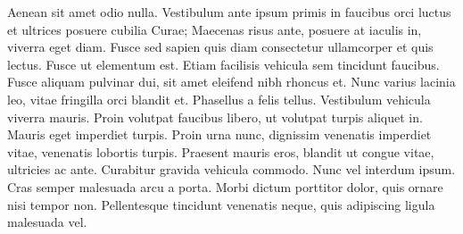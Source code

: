 Aenean sit amet odio nulla.
Vestibulum ante ipsum primis in faucibus orci luctus et ultrices posuere cubilia Curae; Maecenas risus ante, posuere at iaculis in, viverra eget diam.
Fusce sed sapien quis diam consectetur ullamcorper et quis lectus.
Fusce ut elementum est.
Etiam facilisis vehicula sem tincidunt faucibus.
Fusce aliquam pulvinar dui, sit amet eleifend nibh rhoncus et.
Nunc varius lacinia leo, vitae fringilla orci blandit et.
Phasellus a felis tellus.
Vestibulum vehicula viverra mauris.
Proin volutpat faucibus libero, ut volutpat turpis aliquet in.
Mauris eget imperdiet turpis.
Proin urna nunc, dignissim venenatis imperdiet vitae, venenatis lobortis turpis.
Praesent mauris eros, blandit ut congue vitae, ultricies ac ante.
Curabitur gravida vehicula commodo.
Nunc vel interdum ipsum.
Cras semper malesuada arcu a porta.
Morbi dictum porttitor dolor, quis ornare nisi tempor non.
Pellentesque tincidunt venenatis neque, quis adipiscing ligula malesuada vel.